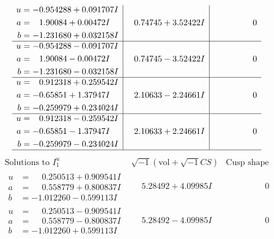\documentclass[1p]{elsarticle_modified}
\theoremstyle{definition}
\newcommand{\I}{\sqrt{-1}}
\begin{document}
$$\begin{array}{c|c|c}
\begin{aligned}
u &= -0.954288 + 0.091707 I \\
a &= \phantom{-}1.90084 + 0.00472 I \\
b &= -1.231680 + 0.032158 I\end{aligned}
 & \phantom{-}0.74745 + 3.52422 I & \phantom{-0.000000 } 0 \\ \hline\begin{aligned}
u &= -0.954288 - 0.091707 I \\
a &= \phantom{-}1.90084 - 0.00472 I \\
b &= -1.231680 - 0.032158 I\end{aligned}
 & \phantom{-}0.74745 - 3.52422 I & \phantom{-0.000000 } 0 \\ \hline\begin{aligned}
u &= \phantom{-}0.912318 + 0.259542 I \\
a &= -0.65851 + 1.37947 I \\
b &= -0.259979 + 0.234024 I\end{aligned}
 & \phantom{-}2.10633 - 2.24661 I & \phantom{-0.000000 } 0 \\ \hline\begin{aligned}
u &= \phantom{-}0.912318 - 0.259542 I \\
a &= -0.65851 - 1.37947 I \\
b &= -0.259979 - 0.234024 I\end{aligned}
 & \phantom{-}2.10633 + 2.24661 I & \phantom{-0.000000 } 0\\
 \hline 
 \end{array}$$\newpage$$\begin{array}{c|c|c}  
\text{Solutions to }I^u_{1}& \I (\text{vol} + \sqrt{-1}CS) & \text{Cusp shape}\\
 \hline 
\begin{aligned}
u &= \phantom{-}0.250513 + 0.909541 I \\
a &= \phantom{-}0.558779 + 0.800837 I \\
b &= -1.012260 - 0.599113 I\end{aligned}
 & \phantom{-}5.28492 + 4.09985 I & \phantom{-0.000000 } 0 \\ \hline\begin{aligned}
u &= \phantom{-}0.250513 - 0.909541 I \\
a &= \phantom{-}0.558779 - 0.800837 I \\
b &= -1.012260 + 0.599113 I\end{aligned}
 & \phantom{-}5.28492 - 4.09985 I & \phantom{-0.000000 } 0 \\ \hline\begin{aligned}

\end{aligned}
\end{array}$$
\end{document}
